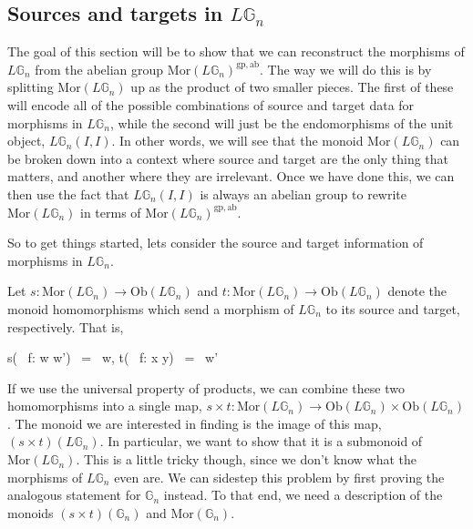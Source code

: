 \subsection{Sources and targets in $L\mathbb{G}_n$}

The goal of this section will be to show that we can reconstruct the morphisms of $L\mathbb{G}_n$ from the abelian group $\mathrm{Mor}(L\mathbb{G}_n)^{\mathrm{gp, ab}}$. The way we will do this is by splitting $\mathrm{Mor}(L\mathbb{G}_n)$ up as the product of two smaller pieces. The first of these will encode all of the possible combinations of source and target data for morphisms in $L\mathbb{G}_n$, while the second will just be the endomorphisms of the unit object, $L\mathbb{G}_n(I, I)$. In other words, we will see that the monoid $\mathrm{Mor}(L\mathbb{G}_n)$ can be broken down into a context where source and target are the only thing that matters, and another where they are irrelevant. Once we have done this, we can then use the fact that $L\mathbb{G}_n(I, I)$ is always an abelian group to rewrite $\mathrm{Mor}(L\mathbb{G}_n)$ in terms of $\mathrm{Mor}(L\mathbb{G}_n)^{\mathrm{gp, ab}}$.

So to get things started, lets consider the source and target information of morphisms in $L\mathbb{G}_n$.

\begin{defn} Let $s: \mathrm{Mor}(L\mathbb{G}_n) \to \mathrm{Ob}(L\mathbb{G}_n)$ and $t: \mathrm{Mor}(L\mathbb{G}_n) \to \mathrm{Ob}(L\mathbb{G}_n)$ denote the monoid homomorphisms which send a morphism of $L\mathbb{G}_n$ to its source and target, respectively. That is,
\begin{eq*} s( \, f: w \to w') \, = \, w, \quad \quad t( \, f: x \to y) \, = \, w' \end{eq*}
\end{defn}

If we use the universal property of products, we can combine these two homomorphisms into a single map, $s \times t: \mathrm{Mor}(L\mathbb{G}_n) \to \mathrm{Ob}(L\mathbb{G}_n) \times \mathrm{Ob}(L\mathbb{G}_n)$. The monoid we are interested in finding is the image of this map, $(s \times t)(L\mathbb{G}_n)$. In particular, we want to show that it is a submonoid of $\mathrm{Mor}(L\mathbb{G}_n)$. This is a little tricky though, since we don't know what the morphisms of $L\mathbb{G}_n$ even are. We can sidestep this problem by first proving the analogous statement for $\mathbb{G}_n$ instead. To that end, we need a description of the monoids $(s \times t)(\mathbb{G}_n)$ and $\mathrm{Mor}(\mathbb{G}_n)$.

